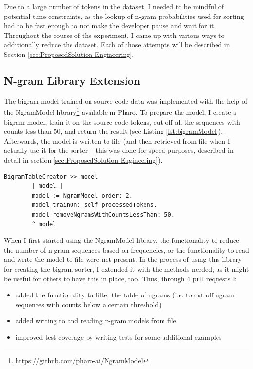 Due to a large number of tokens in the dataset, I needed to be mindful of potential time constraints, as the lookup of n-gram probabilities used for sorting had to be fast enough to not make the developer pause and wait for it. Throughout the course of the experiment, I came up with various ways to additionally reduce the dataset. Each of those attempts will be described in Section \ref{sec:ProposedSolution-Engineering}.

\subsection{N-gram Library Extension}
The bigram model trained on source code data was implemented with the help of the NgramModel library\footnote{\url{https://github.com/pharo-ai/NgramModel}} available in Pharo. To prepare the model, I create a bigram model, train it on the source code tokens, cut off all the sequences with counts less than 50, and return the result (see Listing \ref{lst:bigramModel}). Afterwards, the model is written to file (and then retrieved from file when I actually use it for the sorter -- this was done for speed purposes, described in detail in section \ref{sec:ProposedSolution-Engineering}).

\begin{lstlisting}[label={lst:bigramModel}, caption={Here is how the bigram model for sorting is created and trained}]
    BigramTableCreator >> model
        | model |
        model := NgramModel order: 2.
        model trainOn: self processedTokens.
        model removeNgramsWithCountsLessThan: 50.
        ^ model
\end{lstlisting}

When I first started using the NgramModel library, the functionality to reduce the number of n-gram sequences based on frequencies, or the functionality to read and write the model to file were not present. In the process of using this library for creating the bigram sorter, I extended it with the methods needed, as it might be useful for others to have this in place, too. Thus, through 4 pull requests I:
\begin{itemize}
    \item added the functionality to filter the table of ngrams (i.e. to cut off ngram sequences with counts below a certain threshold)
    \item added writing to and reading n-gram models from file
    \item improved test coverage by writing tests for some additional examples
\end{itemize}


